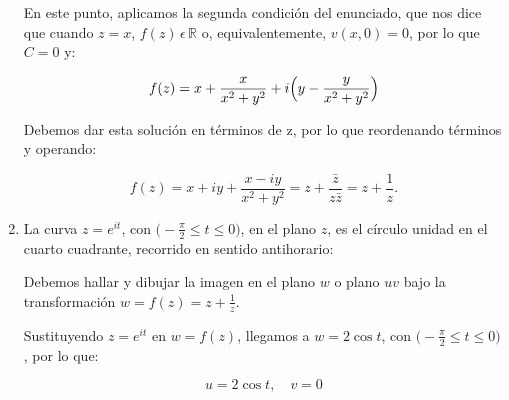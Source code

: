 \begin{enumerate}
    En este punto, aplicamos la segunda condición del enunciado, que nos dice que cuando $z=x$, $f(z)\,\epsilon\,\mathbb{R}$ o, equivalentemente,
    $v(x,0) = 0$, por lo que $C = 0$ y:


    \begin{equation*}
        f(z) = x + \frac{x}{x^2+y^2} + i \Bigl(y - \frac{y}{x^2+y^2}\Bigr)
    \end{equation*}

    Debemos dar esta solución en términos de z, por lo que reordenando términos y operando:


    \begin{equation*}
        f(z) = x + i y + \frac{x - iy}{x^2+y^2} = z + \frac{\bar{z}}{z\bar{z}} = z + \frac{1}{z}.
    \end{equation*}


    \vspace{20px}
    \item La curva $z = e^{it}$, con $\bigl(- \frac{\pi}{2} \leq t \leq 0 \bigr)$, en el plano $z$, es
    el círculo unidad en el cuarto cuadrante, recorrido en sentido antihorario:

    \begin{center}
    \end{center}

    Debemos hallar y dibujar la imagen en el plano $w$ o plano $uv$ bajo la transformación $w= f(z) = z + \frac{1}{z}$.

    Sustituyendo $z = e^{it}$ en $w = f(z)$, llegamos a $w = 2 \cos{t} $, con $\bigl(- \frac{\pi}{2} \leq t \leq 0 \bigr)$, por lo que:

    \begin{equation*}
        u = 2 \cos{t},\hspace{12pt} v = 0
    \end{equation*}


\end{enumerate}
